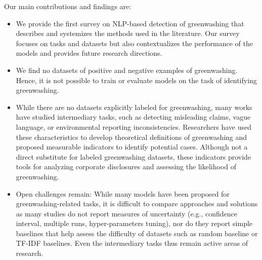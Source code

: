 Our main contributions and findings are: 
\begin{itemize}
    \item We provide the first survey on NLP-based  detection of greenwashing that describes and systemizes the methods used in the literature. Our survey focuses on tasks and datasets but also contextualizes the performance of the models and provides future research directions. 
    \item We find no datasets of positive and negative examples of greenwashing. Hence, it is not possible to train or evaluate models on the task of identifying greenwashing.
    \item While there are no datasets explicitly labeled for greenwashing, many works have studied %
    intermediary tasks, such as detecting misleading claims, vague language, or environmental reporting inconsistencies. Researchers have used these characteristics to develop theoretical definitions of greenwashing and proposed measurable indicators to identify potential cases. Although not a direct substitute for labeled greenwashing datasets, these indicators provide tools for analyzing corporate disclosures and assessing the likelihood of greenwashing.
    \item Open challenges remain: While many models have been proposed for greenwashing-related tasks, it is difficult to compare approaches and solutions as many studies do not report measures of uncertainty (e.g., confidence interval, multiple runs, hyper-parameters tuning), nor do they report simple baselines that help assess the difficulty of datasets such as random baseline or TF-IDF baselines. Even the intermediary tasks thus remain active areas of research.
\end{itemize}

